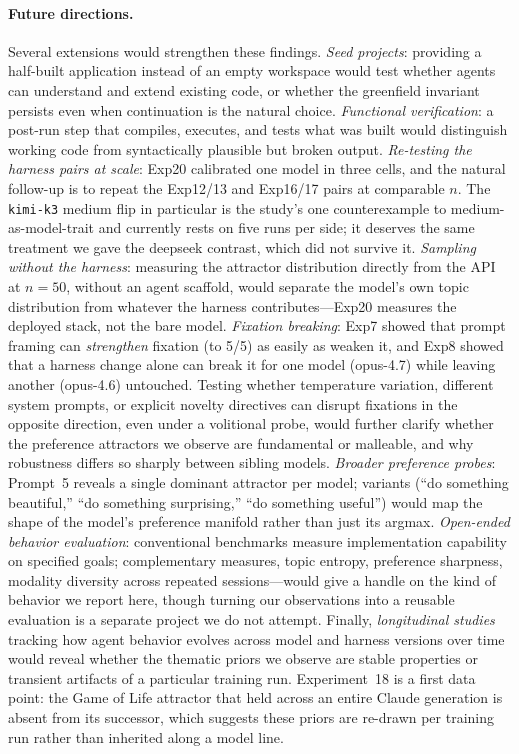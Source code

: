 \documentclass{article}
\begin{document}
\paragraph{Future directions.}
Several extensions would strengthen these findings.
\emph{Seed projects}: providing a half-built application instead
of an empty workspace would test whether agents can understand
and extend existing code, or whether the greenfield invariant
persists even when continuation is the natural choice.
\emph{Functional verification}: a post-run step that compiles,
executes, and tests what was built would distinguish working code
from syntactically plausible but broken output.
\emph{Re-testing the harness pairs at scale}: Exp20 calibrated one
model in three cells, and the natural follow-up is to repeat the
Exp12/13 and Exp16/17 pairs at comparable $n$. The
\texttt{kimi-k3} medium flip in particular is the study's one
counterexample to medium-as-model-trait and currently rests on
five runs per side; it deserves the same treatment we gave the
deepseek contrast, which did not survive it.
\emph{Sampling without the harness}: measuring the attractor
distribution directly from the API at $n=50$, without an agent
scaffold, would separate the model's own topic distribution from
whatever the harness contributes---Exp20 measures the deployed
stack, not the bare model.
\emph{Fixation breaking}: Exp7 showed that prompt framing can
\emph{strengthen} fixation (to 5/5) as easily as weaken it, and
Exp8 showed that a harness change alone can break it for one
model (opus-4.7) while leaving another (opus-4.6) untouched.
Testing whether temperature variation, different system prompts,
or explicit novelty directives can disrupt fixations in the
opposite direction, even under a volitional probe, would further
clarify whether the preference attractors we observe are
fundamental or malleable, and why robustness differs so sharply
between sibling models.
\emph{Broader preference probes}: Prompt~5 reveals a single
dominant attractor per model; variants (``do something
beautiful,'' ``do something surprising,'' ``do something
useful'') would map the shape of the model's preference manifold
rather than just its argmax.
\emph{Open-ended behavior evaluation}: conventional benchmarks
measure implementation capability on specified goals;
complementary measures, topic entropy, preference sharpness,
modality diversity across repeated sessions---would give a
handle on the kind of behavior we report here, though turning
our observations into a reusable evaluation is a separate
project we do not attempt. Finally, \emph{longitudinal studies}
tracking how agent behavior evolves across model and harness
versions over time would reveal whether the thematic priors we
observe are stable properties or transient artifacts of a
particular training run. Experiment~18 is a first data point:
the Game of Life attractor that held across an entire Claude
generation is absent from its successor, which suggests these
priors are re-drawn per training run rather than inherited along
a model line.
\end{document}
